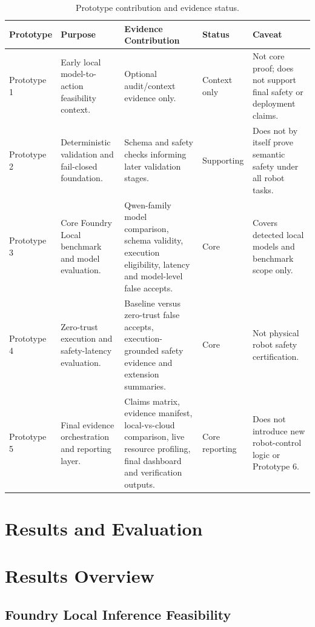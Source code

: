 \documentclass[sigconf,nonacm]{acmart}
\begin{document}
\begin{table}[t]
\centering
\caption{Prototype contribution and evidence status.}
\label{tab:prototype_contribution}
\footnotesize
\begin{tabularx}{\textwidth}{L{0.12\textwidth}Y Y L{0.14\textwidth}Y}
\toprule
Prototype & Purpose & Evidence Contribution & Status & Caveat \\
\midrule
Prototype 1 & Early local model-to-action feasibility context. & Optional audit/context evidence only. & Context only & Not core proof; does not support final safety or deployment claims. \\

Prototype 2 & Deterministic validation and fail-closed foundation. & Schema and safety checks informing later validation stages. & Supporting & Does not by itself prove semantic safety under all robot tasks. \\

Prototype 3 & Core Foundry Local benchmark and model evaluation. & Qwen-family model comparison, schema validity, execution eligibility, latency and model-level false accepts. & Core & Covers detected local models and benchmark scope only. \\

Prototype 4 & Zero-trust execution and safety-latency evaluation. & Baseline versus zero-trust false accepts, execution-grounded safety evidence and extension summaries. & Core & Not physical robot safety certification. \\

Prototype 5 & Final evidence orchestration and reporting layer. & Claims matrix, evidence manifest, local-vs-cloud comparison, live resource profiling, final dashboard and verification outputs. & Core reporting & Does not introduce new robot-control logic or Prototype 6. \\
\bottomrule
\end{tabularx}
\end{table}

\section{Results and Evaluation}

\section{Results Overview}
\label{sec:results_overview}

\subsection{Foundry Local Inference Feasibility}
\end{document}

